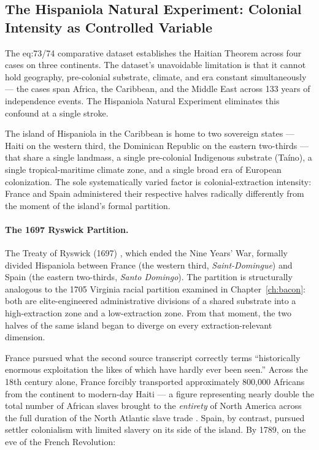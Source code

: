 
\subsection{The Hispaniola Natural Experiment: Colonial Intensity as Controlled Variable}
\label{sec:hispaniola_natural_experiment}

The eq:73/74 comparative dataset establishes the Haitian Theorem across four cases on three continents. The dataset's unavoidable limitation is that it cannot hold geography, pre-colonial substrate, climate, and era constant simultaneously --- the cases span Africa, the Caribbean, and the Middle East across 133 years of independence events. The Hispaniola Natural Experiment eliminates this confound at a single stroke.

The island of Hispaniola in the Caribbean is home to two sovereign states --- Haiti on the western third, the Dominican Republic on the eastern two-thirds --- that share a single landmass, a single pre-colonial Indigenous substrate (Ta\'ino), a single tropical-maritime climate zone, and a single broad era of European colonization. The sole systematically varied factor is colonial-extraction intensity: France and Spain administered their respective halves radically differently from the moment of the island's formal partition.

\paragraph{The 1697 Ryswick Partition.}
The Treaty of Ryswick (1697) \cite{treaty_ryswick_1697}, which ended the Nine Years' War, formally divided Hispaniola between France (the western third, \textit{Saint-Domingue}) and Spain (the eastern two-thirds, \textit{Santo Domingo}). The partition is structurally analogous to the 1705 Virginia racial partition examined in Chapter~\ref{ch:bacon}: both are elite-engineered administrative divisions of a shared substrate into a high-extraction zone and a low-extraction zone. From that moment, the two halves of the same island began to diverge on every extraction-relevant dimension.

France pursued what the second source transcript correctly terms ``historically enormous exploitation the likes of which have hardly ever been seen.'' Across the 18th century alone, France forcibly transported approximately 800,000 Africans from the continent to modern-day Haiti --- a figure representing nearly double the total number of African slaves brought to the \textit{entirety} of North America across the full duration of the North Atlantic slave trade \cite{dubois_avengers_new_world}. Spain, by contrast, pursued settler colonialism with limited slavery on its side of the island. By 1789, on the eve of the French Revolution:

